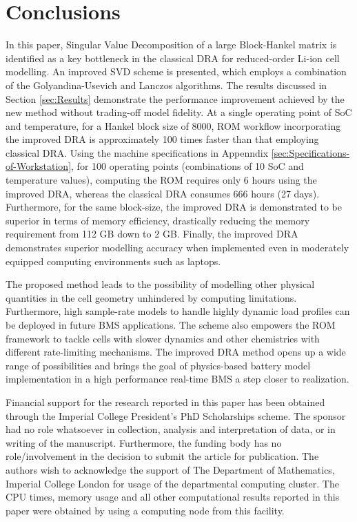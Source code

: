 \begin{figure}
	\caption{}
	\label{time_domain_sim}
\end{figure}

\section{Conclusions\label{sec:Conclusion}}
In this paper, Singular Value Decomposition of a large Block-Hankel
matrix is identified as a key bottleneck in the classical DRA for
reduced-order Li-ion cell modelling. An improved SVD scheme is presented,
which employs a combination of the Golyandina-Usevich and Lanczos
algorithms. The results discussed in Section \ref{sec:Results} demonstrate
the performance improvement achieved by the new method without trading-off
model fidelity. At a single operating point of SoC and temperature,
for a Hankel block size of 8000, ROM workflow incorporating the improved
DRA is approximately 100 times faster than that employing classical
DRA. Using the machine specifications in Appenndix  \ref{sec:Specifications-of-Workstation},
for 100 operating points (combinations of 10 SoC and temperature values),
computing the ROM requires only 6 hours using the improved DRA, whereas
the classical DRA consumes 666 hours (27 days). Furthermore, for the
same block-size, the improved DRA is demonstrated to be superior in
terms of memory efficiency, drastically reducing the memory requirement
from 112 GB down to 2 GB. Finally, the improved DRA demonstrates superior
modelling accuracy when implemented even in moderately equipped computing
environments such as laptops.

The proposed method leads to the possibility of modelling other physical
quantities in the cell geometry unhindered by computing limitations.
Furthermore, high sample-rate models to handle highly dynamic load
profiles can be deployed in future BMS applications. The scheme also
empowers the ROM framework to tackle cells with slower dynamics and
other chemistries with different rate-limiting mechanisms. The improved
DRA method opens up a wide range of possibilities and brings the goal
of physics-based battery model implementation in a high performance
real-time BMS a step closer to realization.

\begin{acknowledgment}
Financial support for the research reported in this paper has been
obtained through the Imperial College President's PhD Scholarships
scheme. The sponsor had no role whatsoever in collection, analysis
and interpretation of data, or in writing of the manuscript. Furthermore,
the funding body has no role/involvement in the decision to submit
the article for publication. The authors wish to acknowledge the support
of The Department of Mathematics, Imperial College London for usage
of the departmental computing cluster. The CPU times, memory usage
and all other computational results reported in this paper were obtained
by using a computing node from this facility.
\end{acknowledgment}

